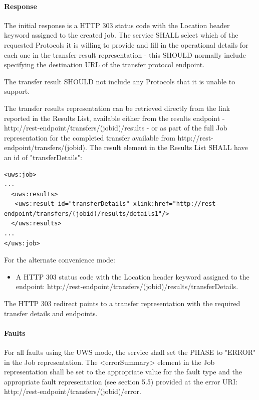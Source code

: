 \documentclass[11pt,a4paper]{ivoa}
\begin{document}
\paragraph{Response}
The initial response is a HTTP 303 status code with the Location header keyword assigned to the created job.
The service SHALL select which of the requested Protocols it is willing to provide and fill in the operational details for each one in the transfer result representation - this SHOULD normally include specifying the destination URL of the transfer protocol endpoint.

The transfer result SHOULD not include any Protocols that it is unable to support.

The transfer results representation can be retrieved directly from the link reported in the Results List, available either from the results endpoint - http://rest-endpoint/transfers/(jobid)/results - or as part of the full Job representation for the completed transfer available from http://rest-endpoint/transfers/(jobid). The result element in the Results List SHALL have an id of "transferDetails":
\begin{lstlisting}
<uws:job>
...
  <uws:results>
   <uws:result id="transferDetails" xlink:href="http://rest-endpoint/transfers/(jobid)/results/details1"/>
  </uws:results>
...
</uws:job>
\end{lstlisting}
For the alternate convenience mode:
\begin{itemize}
    \item A HTTP 303 status code with the Location header keyword assigned to the endpoint: http://rest-endpoint/transfers/(jobid)/results/transferDetails.
\end{itemize}
The HTTP 303 redirect points to a transfer representation with the required transfer details and endpoints.

\paragraph{Faults}
For all faults using the UWS mode, the service shall set the PHASE to "ERROR" in the Job representation. The <errorSummary> element in the Job representation shall be set to the appropriate value for the fault type and the appropriate fault representation (see section 5.5) provided at the error URI: http://rest-endpoint/transfers/(jobid)/error.
\end{document}
